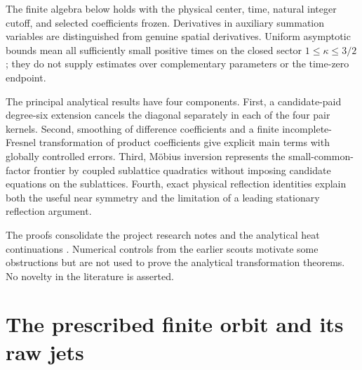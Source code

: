 \documentclass[11pt]{article}
\numberwithin{equation}{section}
\theoremstyle{definition}
\theoremstyle{remark}
\begin{document}
The finite algebra below holds with the physical center, time, natural
integer cutoff, and selected coefficients frozen. Derivatives in
auxiliary summation variables are distinguished from genuine spatial
derivatives. Uniform asymptotic bounds mean all sufficiently small
positive times on the closed sector
$1\le\kappa\le3/2$; they do not supply estimates over complementary
parameters or the time-zero endpoint.

The principal analytical results have four components. First, a
candidate-paid degree-six extension cancels the diagonal separately in
each of the four pair kernels. Second, smoothing of difference
coefficients and a finite incomplete-Fresnel transformation of product
coefficients give explicit main terms with globally controlled errors.
Third, M\"obius inversion represents the small-common-factor frontier by
coupled sublattice quadratics without imposing candidate equations on the
sublattices. Fourth, exact physical reflection identities explain both
the useful near symmetry and the limitation of a leading stationary
reflection argument.

The proofs consolidate the project research notes \cite{projectnotes}
and the analytical heat continuations \cite{heatnotes}. Numerical controls
from the earlier scouts motivate some obstructions but are not used to
prove the analytical transformation theorems. No novelty in the literature
is asserted.

\section{The prescribed finite orbit and its raw jets}
\label{fo:state}
\end{document}
